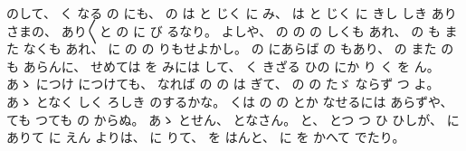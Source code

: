 のして、%
%
く
なる
の
にも、
%
の
は
と
じく
に
み、
%
は
と
じく
%
に
きし
しき
ありさまの、
%
あり〳〵と
の
に%
び
るなり。
%
よしや、
%
の
の
の
しくも
あれ、
%
の
も
また
なくも
あれ、
%
に
の
の
りもせよかし。
%
の
にあらば
の
もあり、
%
の
また
の
も
あらんに、
%
せめては
を
%
みには
して、
%
く
きざる
ひの
にか
り
く
を
ん。
%
あゝ%
につけ
につけても、
%
なれば
の
の
は
ぎて、
%
の
の
たゞ%
ならず
つ
よ。
%
あゝ%
となく
しく
ろしき
のするかな。
%
くは
の
の
とか
なせるには
あらずや、
%
ても
つても
の%
からぬ。
%
あゝ%
とせん、
%
となさん。
%
と、
%
とつ
つ
ひ
ひしが、
%
に%
ありて
に
えん
よりは、
%
に
りて、
%
を
はんと、%
%
に
を
かへて
でたり。


